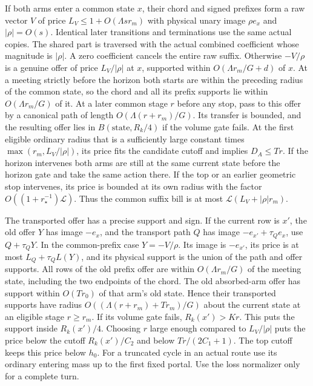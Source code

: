 \documentclass[11pt]{article}
\begin{document}
\begin{itemize}
  If both arms enter a common state \(x\), their chord and signed prefixes form a raw vector \(V\) of price \(L_V\le 1+O(\Lambda s r_m)\) with physical unary image \(\rho e_x\) and \(|\rho|=O(s)\). Identical later transitions and terminations use the same actual copies. The shared part is traversed with the actual combined coefficient whose magnitude is \(|\rho|\). A zero coefficient cancels the entire raw suffix. Otherwise \(-V/\rho\) is a genuine offer of price \(L_V/|\rho|\) at \(x\), supported within \(O(\Lambda r_m/G+d)\) of \(x\). At a meeting strictly before the horizon both starts are within the preceding radius of the common state, so the chord and all its prefix supports lie within \(O(\Lambda r_m/G)\) of it. At a later common stage \(r\) before any stop, pass to this offer by a canonical path of length \(O(\Lambda(r+r_m)/G)\). Its transfer is bounded, and the resulting offer lies in \(B(\text{state},R_k/4)\) if the volume gate fails. At the first eligible ordinary radius that is a sufficiently large constant times \(\max(r_m,L_V/|\rho|)\), its price fits the candidate cutoff and implies \(D_A\le T r\). If the horizon intervenes both arms are still at the same current state before the horizon gate and take the same action there. If the top or an earlier geometric stop intervenes, its price is bounded at its own radius with the factor \(O((1+r_\star^{-1})\mathcal L)\). Thus the common suffix bill is at most \(\mathcal L(L_V+|\rho|r_m)\).
\end{itemize}

The transported offer has a precise support and sign. If the current row is \(x'\), the old offer \(Y\) has image \(-e_x\), and the transport path \(Q\) has image \(-e_{x'}+\tau_Q e_x\), use \(Q+\tau_Q Y\). In the common-prefix case \(Y=-V/\rho\). Its image is \(-e_{x'}\), its price is at most \(L_Q+\tau_Q L(Y)\), and its physical support is the union of the path and offer supports. All rows of the old prefix offer are within \(O(\Lambda r_m/G)\) of the meeting state, including the two endpoints of the chord. The old absorbed-arm offer has support within \(O(T r_0)\) of that arm's old state. Hence their transported supports have radius \(O((\Lambda(r+r_m)+T r_m)/G)\) about the current state at an eligible stage \(r\ge r_m\). If its volume gate fails, \(R_k(x')>Kr\). This puts the support inside \(R_k(x')/4\). Choosing \(r\) large enough compared to \(L_V/|\rho|\) puts the price below the cutoff \(R_k(x')/C_2\) and below \(Tr/(2C_1+1)\). The top cutoff keeps this price below \(h_0\). For a truncated cycle in an actual route use its ordinary entering mass up to the first fixed portal. Use the loss normalizer only for a complete turn.
\end{document}
